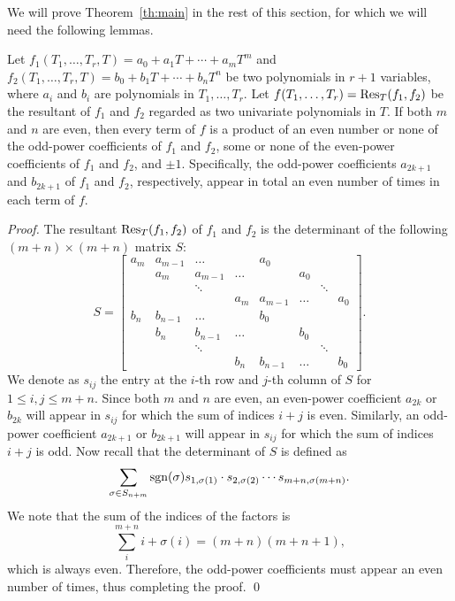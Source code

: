 We will prove Theorem~\ref{th:main} in the rest of this section, for
which we will need the following lemmas.
%
\begin{lemma}
  \label{th:resultant}
  Let $f_1(T_1,\ldots,T_r,T)=a_0 + a_1T + \cdots + a_mT^m$ and
  $f_2(T_1,\ldots,T_r,T)=b_0 + b_1T + \cdots + b_nT^n$ be two
  polynomials in $r+1$ variables, where $a_i$ and $b_i$ are
  polynomials in $T_1,\ldots,T_r$.
  Let $f(T_1,\ldots,T_r)=\operatorname{Res}_T(f_1,f_2)$ be the resultant of $f_1$
  and $f_2$ regarded as two univariate polynomials in $T$.
  If both $m$ and $n$ are even, then every term of $f$ is a product of
  an even number or none of the odd-power coefficients of $f_1$ and
  $f_2$, some or none of the even-power coefficients of $f_1$ and
  $f_2$, and $\pm 1$.
  Specifically, the odd-power coefficients $a_{2k+1}$ and $b_{2k+1}$
  of $f_1$ and $f_2$, respectively, appear in total an even number of
  times in each term of $f$.
\end{lemma}
%
\begin{proof}
  The resultant $\operatorname{Res}_T(f_1,f_2)$ of $f_1$ and $f_2$ is the
  determinant of the following $(m+n)\times(m+n)$ matrix $S$:
  \begin{equation*}
    S = \begin{bmatrix}
      a_m & a_{m-1} & \ldots & & a_0 & & &  \\
      & a_m & a_{m-1} & \ldots & & a_0  & &  \\
      & & \ddots & & & & \ddots &  \\
      & & & a_m & a_{m-1} & \ldots & & a_0  \\
      b_n & b_{n-1} & \ldots & & b_0 & & &  \\
      & b_n & b_{n-1} & \ldots & & b_0  & &  \\
      & & \ddots & & & & \ddots &  \\
      & & & b_n & b_{n-1} & \ldots & & b_0
    \end{bmatrix}.
  \end{equation*}
  We denote as $s_{ij}$ the entry at the $i$-th row and $j$-th column
  of $S$ for $1\leq i,j\leq m+n$.
  Since both $m$ and $n$ are even, an even-power coefficient $a_{2k}$
  or $b_{2k}$ will appear in $s_{ij}$ for which the sum of indices
  $i+j$ is even.
  Similarly, an odd-power coefficient $a_{2k+1}$ or $b_{2k+1}$ will
  appear in $s_{ij}$ for which the sum of indices $i+j$ is odd.
  Now recall that the determinant of $S$ is defined as
  \[ \sum_{\sigma\in S_{n+m}}\operatorname{sgn}(\sigma)s_{1,\sigma(1)}\cdot
    s_{2,\sigma(2)}\cdots s_{m+n,\sigma(m+n)}. \]
  We note that the sum of the indices of the factors is
  \[ \sum_i^{m+n}i+\sigma(i)=(m+n)(m+n+1), \] which is always even.
  Therefore, the odd-power coefficients must appear an even number of
  times, thus completing the proof.
  \qed
\end{proof}
